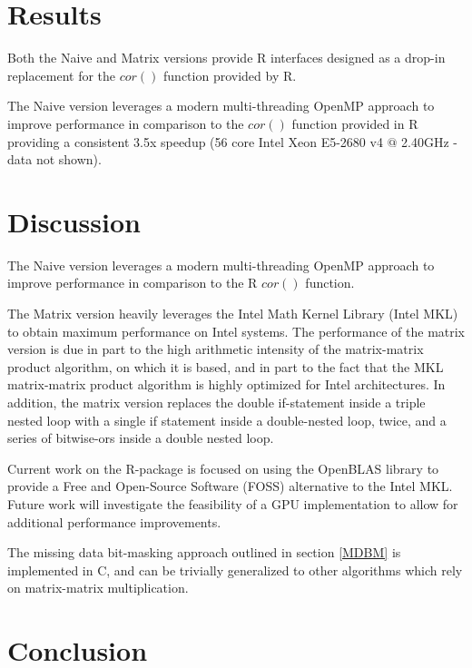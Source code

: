 \documentclass{bioinfo}
\begin{document}
\section{Results}
Both the Naive and Matrix versions provide R interfaces designed as a drop-in 
replacement for the $cor()$ function provided by R.

The Naive version leverages a modern multi-threading OpenMP approach 
to improve performance in comparison to the $cor()$ function provided 
in R providing a consistent 3.5x speedup (56 core Intel Xeon E5-2680 
v4 $@$ 2.40GHz - data not shown). 

\vspace*{-6pt}

\section{Discussion}
The Naive version leverages a modern multi-threading OpenMP approach 
to improve performance in comparison to the R $cor()$ function.

The Matrix version heavily leverages the Intel\textregistered{} Math Kernel 
Library (Intel\textregistered{} MKL) to obtain maximum performance 
on Intel\textregistered{} systems. The performance of the 
matrix version is due in part to the high arithmetic intensity of the matrix-matrix product algorithm, on which it is based, and in 
part to the fact that the MKL matrix-matrix product algorithm is highly optimized for Intel architectures.  In addition, the matrix version replaces 
the double if-statement inside a triple nested loop with a single if statement inside a double-nested loop, twice, and a series of bitwise-ors inside a double nested loop.

Current work on the R-package is focused on using the OpenBLAS 
library to provide a Free and Open-Source Software (FOSS) 
alternative to the Intel\textregistered{} MKL. Future work will 
investigate the feasibility of a GPU implementation to allow 
for additional performance improvements.

The missing data bit-masking approach outlined in section \ref{MDBM} 
is implemented in C, and can be trivially generalized to other 
algorithms which rely on matrix-matrix multiplication. \vspace*{-12pt}

\section{Conclusion}
\end{document}
